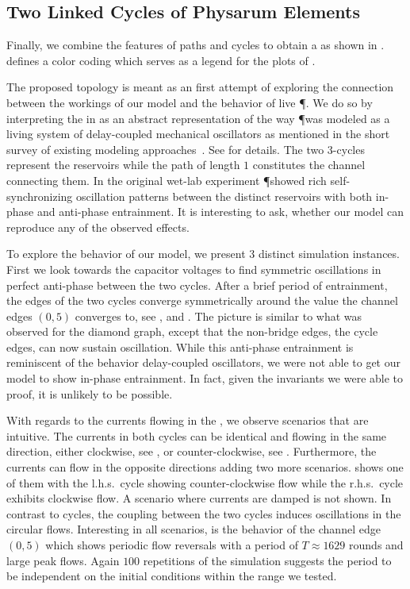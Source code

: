 	\subsection{Two Linked Cycles of Physarum Elements}

		Finally, we combine the features of paths and cycles to obtain a \Pn as shown in .  defines a color coding which serves as a legend for the plots of .

		The proposed topology is meant as an first attempt of exploring the connection between the workings of our model and the behavior of live \P. We do so by interpreting the \Pn in  as an abstract representation of the way \P was modeled as a living system of delay-coupled mechanical oscillators as mentioned in the short survey of existing modeling approaches~\cite{PhysRevLett.85.2026}. See  for details. The two $3$-cycles represent the reservoirs while the path of length $1$ constitutes the channel connecting them. In the original wet-lab experiment \P showed rich self-synchronizing oscillation patterns between the distinct reservoirs with both in-phase and anti-phase entrainment. It is interesting to ask, whether our model can reproduce any of the observed effects.

		To explore the behavior of our model, we present $3$ distinct simulation instances. First we look towards the capacitor voltages to find symmetric oscillations in perfect anti-phase between the two cycles. After a brief period of entrainment, the edges of the two cycles converge symmetrically around the value the channel edges $(0,5)$ converges to, see ,  and . The picture is similar to what was observed for the diamond graph, except that the non-bridge edges, \ie the cycle edges, can now sustain oscillation. While this anti-phase entrainment is reminiscent of the behavior delay-coupled oscillators, we were not able to get our model to show in-phase entrainment. In fact, given the invariants we were able to proof, it is unlikely to be possible.

		With regards to the currents flowing in the \Pn, we observe scenarios that are intuitive. The currents in both cycles can be identical and flowing in the same direction, either clockwise, see , or counter-clockwise, see . Furthermore, the currents can flow in the opposite directions adding two more scenarios.  shows one of them with the l.h.s.\ cycle showing counter-clockwise flow while the r.h.s.\ cycle exhibits clockwise flow. A scenario where currents are damped is not shown. In contrast to cycles, the coupling between the two cycles induces oscillations in the circular flows. Interesting in all scenarios, is the behavior of the channel edge $(0,5)$ which shows periodic flow reversals with a period of $T \approx 1629 $ rounds and large peak flows. Again $100$ repetitions of the simulation suggests the period to be independent on the initial conditions within the range we tested.

